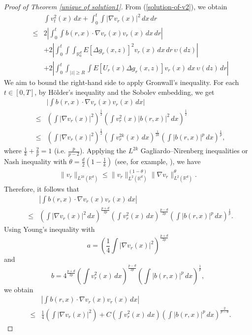 \documentclass[12pt,oneside, reqno]{amsart}
\newcommand{\be}{\begin{eqnarray}}
\newcommand{\ee}{\end{eqnarray}}
\newcommand{\ce}{\begin{eqnarray*}}
\newcommand{\de}{\end{eqnarray*}}
\def\no{\nonumber}
\def\mR{{\mathbb R}}
\def\geq{\geqslant}
\def\leq{\leqslant}
\numberwithin{equation}{section}
\begin{document}
\begin{proof}[Proof of Theorem \ref{unique of solution1}]
From (\ref{solution-of-v2}),  we  obtain
 \be \label{the-last-estimate-Grownall}
&&\int v_t^2(x)\,dx
+\int_0^t\int |\nabla v_r(x)|^2\,dx\,dr \no\\
&\leq& 2|\int_0^t\int b(r,x)\cdot \nabla v_r(x) v_r(x)\,dx\,dr|\no\\
&&+2|\int_0^t\int \int_{\mR^d_0}E\left[\Delta g_{r}(x,z)\right]^2  v_r(x)\,dx\,dr\,\upsilon(dz)|\no\\
&&+2|\int_0^t\int_{|z|\geq R}\int E\left[ U_{r}(x)\Delta g_{r}(x,z)\right] v_r(x)\,dx\,\upsilon(dz)\,dr|
\ee 
We aim to bound the right-hand side to apply Gronwall's inequality. For each $t\in [0,T]$,  by H\"{o}lder's inequality and the Sobolev embedding, we get
 \ce 
 &&\big|\int b(r,x)\cdot \nabla v_r(x) v_r(x)\,dx\big|\\
 &\leq& \left(\int |\nabla v_r(x)|^2 \right)^{\frac{1}{2}}\left(\int v_r^2(x) |b(r,x)|^2 \,dx\right)^{\frac{1}{2}}\\
 &\leq &\left(\int |\nabla v_r(x)|^2 \right)^{\frac{1}{2}}\left(\int v_r^{2k}(x) \,dx\right)^{\frac{1}{2k}}\left(\int |b(r,x)|^p \,dx\right)^{\frac{1}{p}},
 \de  
 where $\frac{1}{k}+\frac{2}{p}=1$ (i.e. $\frac{p}{p-2}$). Applying the $L^{2k}$ Gagliardo–Nirenberg inequalities or Nash inequality with $\theta=\frac{d}{2}\left(1-\frac{1}{k}\right)$  (see, for example, \cite{Agueh2008}), we have 
 \be\label{Gagliardo–Nirenberg inequalities}
 \|v_r\|_{L^{2k}(\mR^d)}\leq \|v_r\|_{L^2(\mR^d)}^{(1-\theta)}\|\nabla v_r\|_{L^2(\mR^d)}^{\theta}.
 \ee 
Therefore, it follows that
\ce
 &&|\int b(r,x)\cdot \nabla v_r(x) v_r(x)\,dx|\\
 &\leq &\left(\int |\nabla v_r(x)|^2 \,dx\right)^{\frac{p+d}{2p}}\left(\int v_r^{2}(x) \,dx\right)^{\frac{p-d}{2p}}\left(\int |b(r,x)|^p \,dx\right)^{\frac{1}{p}}.
 \de 
Using Young's inequality with
  $$a=\left(\frac{1}{4}\int |\nabla v_r(x)|^2 \right)^{\frac{p+d}{2p}}$$
   and 
   $$b=4^{\frac{p+d}{2p}}\left(\int v_r^{2}(x) \,dx\right)^{\frac{p-d}{2p}}\left(\int |b(r,x)|^p \,dx\right)^{\frac{1}{p}},$$
   we  obtain
   \be\label{last-inequality1} 
 &&|\int b(r,x)\cdot \nabla v_r(x) v_r(x)\,dx|\no\\
 &\leq &\frac{1}{4}\left(\int |\nabla v_r(x)|^2 \right)+C\left(\int v_r^{2}(x) \,dx\right)\left(\int |b(r,x)|^p \,dx\right)^{\frac{2}{p-d}}.
 \ee
 

\end{proof}
\end{document}
